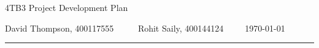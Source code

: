 \documentclass{article}
\author{Rohit Saily, David Thompson, Raymond Tu}
\date{\today}
\title{\mytitle}
\newcommand{\mytitle}{4TB3 Project Development Plan}
\begin{document}
{\sffamily
{\huge \mytitle}

\medskip

David Thompson, 400117555~~~~~
Rohit Saily, 400144124~~~~~\today
}

\par\noindent\rule{\textwidth}{0.4pt}
\bigskip
\end{document}
